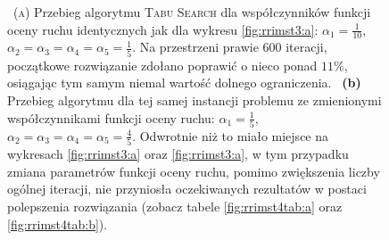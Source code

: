 \begin{figure}[!h]
{		~\textsc{(a)} Przebieg algorytmu \textsc{Tabu Search} dla współczynników funkcji oceny ruchu identycznych jak dla wykresu \ref{fig:rrimst3:a}: $\alpha_{1} = \frac{1}{10}$, $\alpha_{2} = \alpha_{3} = \alpha_{4} = \alpha_{5} = \frac{1}{5}$. Na przestrzeni prawie $600$ iteracji, początkowe rozwiązanie zdołano poprawić o nieco ponad $11\%$, osiągając tym samym niemal wartość dolnego ograniczenia.
		~\textbf{(b)} Przebieg algorytmu dla tej samej instancji problemu ze zmienionymi współczynnikami funkcji oceny ruchu: $\alpha_{1} = \frac{1}{5}$, $\alpha_{2} = \alpha_{3} = \alpha_{4} = \alpha_{5} = \frac{4}{5}$. Odwrotnie niż to miało miejsce na wykresach \ref{fig:rrimst3:a} oraz \ref{fig:rrimst3:a}, w tym przypadku zmiana parametrów funkcji oceny ruchu, pomimo zwiększenia liczby ogólnej iteracji, nie przyniosła oczekiwanych rezultatów w postaci polepszenia rozwiązania (zobacz tabele \ref{fig:rrimst4tab:a} oraz \ref{fig:rrimst4tab:b}).
	}
	\label{fig:rrimst4}
\end{figure}

